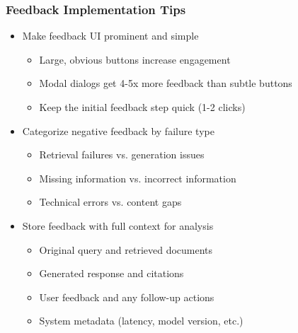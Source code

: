 {    \begin{frame}
        \frametitle{Feedback Implementation Tips}
        \begin{itemize}
            \item Make feedback UI prominent and simple
            \begin{itemize}
                \item Large, obvious buttons increase engagement
                \item Modal dialogs get 4-5x more feedback than subtle buttons
                \item Keep the initial feedback step quick (1-2 clicks)
            \end{itemize}
            \item Categorize negative feedback by failure type
            \begin{itemize}
                \item Retrieval failures vs. generation issues
                \item Missing information vs. incorrect information
                \item Technical errors vs. content gaps
            \end{itemize}
            \item Store feedback with full context for analysis
            \begin{itemize}
                \item Original query and retrieved documents
                \item Generated response and citations
                \item User feedback and any follow-up actions
                \item System metadata (latency, model version, etc.)
            \end{itemize}
        \end{itemize}
    \end{frame}

}
